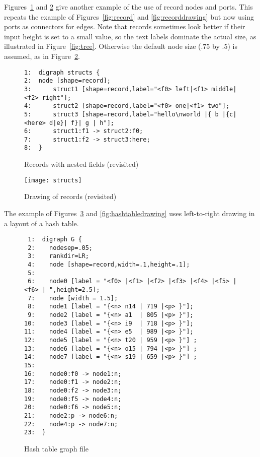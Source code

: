 \documentclass[11pt]{article}
\begin{document}
Figures~\ref{fig:structs} and \ref{fig:structdrawing}
give another example of the use of record nodes and ports.
This repeats the example of 
Figures~\ref{fig:record} and \ref{fig:recorddrawing}
but now using ports as connectors for edges.
Note that records sometimes look better if their input height is set 
to a small value, so the text labels dominate the actual size, as
illustrated in Figure~\ref{fig:tree}.  Otherwise the default node
size ($.75$ by $.5$) is assumed, as in Figure~\ref{fig:structdrawing}.
\begin{figure}[p]\footnotesize
\begin{verbatim}
1:  digraph structs {
2:  node [shape=record];
3:      struct1 [shape=record,label="<f0> left|<f1> middle|<f2> right"];
4:      struct2 [shape=record,label="<f0> one|<f1> two"];
5:      struct3 [shape=record,label="hello\nworld |{ b |{c|<here> d|e}| f}| g | h"];
6:      struct1:f1 -> struct2:f0;
7:      struct1:f2 -> struct3:here;
8:  }
\end{verbatim}
\caption{Records with nested fields (revisited)}
\label{fig:structs}
\end{figure}
\begin{figure}[p]
	\centerline {
		\texttt{[image: structs]}
	}
    \caption{Drawing of records (revisited)}
    \label{fig:structdrawing}
\end{figure}
The example of Figures~\ref{fig:hashtable} and \ref{fig:hashtabledrawing}
uses left-to-right drawing in a layout of a hash table.
\begin{figure}[p]\footnotesize
\begin{verbatim}
 1:  digraph G {
 2:    nodesep=.05;
 3:    rankdir=LR;
 4:    node [shape=record,width=.1,height=.1];
 5:  
 6:    node0 [label = "<f0> |<f1> |<f2> |<f3> |<f4> |<f5> |<f6> | ",height=2.5];
 7:    node [width = 1.5];
 8:    node1 [label = "{<n> n14 | 719 |<p> }"];
 9:    node2 [label = "{<n> a1  | 805 |<p> }"];
10:    node3 [label = "{<n> i9  | 718 |<p> }"];
11:    node4 [label = "{<n> e5  | 989 |<p> }"];
12:    node5 [label = "{<n> t20 | 959 |<p> }"] ;
13:    node6 [label = "{<n> o15 | 794 |<p> }"] ;
14:    node7 [label = "{<n> s19 | 659 |<p> }"] ;
15:  
16:    node0:f0 -> node1:n;
17:    node0:f1 -> node2:n;
18:    node0:f2 -> node3:n;
19:    node0:f5 -> node4:n;
20:    node0:f6 -> node5:n;
21:    node2:p -> node6:n;
22:    node4:p -> node7:n;
23:  }
\end{verbatim}\vspace*{-.25in}
\caption{Hash table graph file}
\label{fig:hashtable}
\end{figure}
\end{document}
